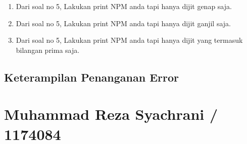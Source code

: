\begin{enumerate}
    \item Dari soal no 5, Lakukan print NPM anda tapi hanya dijit genap saja.
    

    \item Dari soal no 5, Lakukan print NPM anda tapi hanya dijit ganjil saja.
    

    \item Dari soal no 5, Lakukan print NPM anda tapi hanya dijit yang termasuk bilangan prima saja.
    

\end{enumerate}
\subsection{Keterampilan Penanganan Error}
    
	

\section{Muhammad Reza Syachrani / 1174084}
